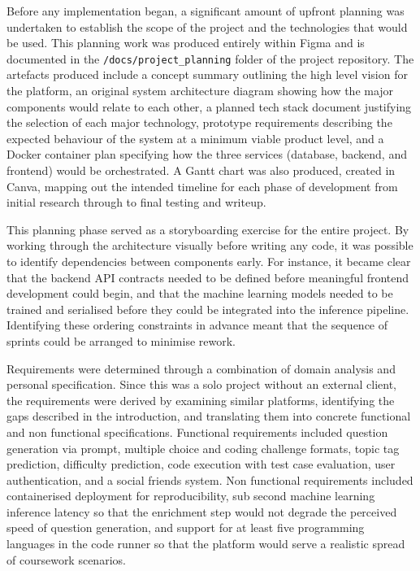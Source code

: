 Before any implementation began, a significant amount of upfront planning
was undertaken to establish the scope of the project and the technologies
that would be used. This planning work was produced entirely within Figma
and is documented in the \texttt{/docs/project\_planning} folder of the
project repository. The artefacts produced include a concept summary
outlining the high level vision for the platform, an original system
architecture diagram showing how the major components would relate to each
other, a planned tech stack document justifying the selection of each
major technology, prototype requirements describing the expected behaviour
of the system at a minimum viable product level, and a Docker container
plan specifying how the three services (database, backend, and frontend)
would be orchestrated. A Gantt chart was also produced, created in Canva,
mapping out the intended timeline for each phase of development from
initial research through to final testing and writeup.

This planning phase served as a storyboarding exercise for the entire
project. By working through the architecture visually before writing any
code, it was possible to identify dependencies between components early.
For instance, it became clear that the backend API contracts needed to be
defined before meaningful frontend development could begin, and that the
machine learning models needed to be trained and serialised before they
could be integrated into the inference pipeline. Identifying these ordering
constraints in advance meant that the sequence of sprints could be
arranged to minimise rework.

Requirements were determined through a combination of domain analysis and
personal specification. Since this was a solo project without an external
client, the requirements were derived by examining similar platforms,
identifying the gaps described in the introduction, and translating them
into concrete functional and non functional specifications. Functional
requirements included question generation via prompt, multiple choice and
coding challenge formats, topic tag prediction, difficulty prediction,
code execution with test case evaluation, user authentication, and a
social friends system. Non functional requirements included containerised
deployment for reproducibility, sub second machine learning inference
latency so that the enrichment step would not degrade the perceived speed
of question generation, and support for at least five programming languages
in the code runner so that the platform would serve a realistic spread of
coursework scenarios.

